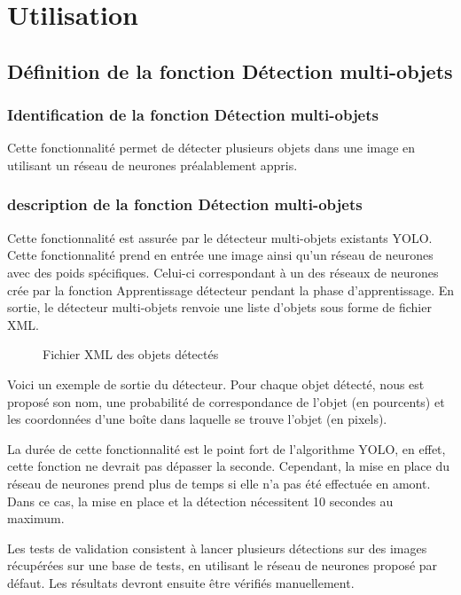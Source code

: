 \documentclass[debug,nodate,hideweeklyreports]{polytech/polytech}
\begin{document}
\section{Utilisation}

\subsection{Définition de la fonction Détection multi-objets}

\subsubsection{Identification de la fonction Détection multi-objets}

Cette fonctionnalité permet de détecter plusieurs objets dans une image en utilisant un réseau de neurones préalablement appris.

\subsubsection{description de la fonction Détection multi-objets}

Cette fonctionnalité est assurée par le détecteur multi-objets existants YOLO.
Cette fonctionnalité prend en entrée une image ainsi qu’un réseau de neurones avec des poids spécifiques. Celui-ci correspondant à un des réseaux de neurones crée par la fonction Apprentissage détecteur pendant la phase d’apprentissage.
En sortie, le détecteur multi-objets renvoie une liste d’objets sous forme de fichier XML.

\begin{figure}
  \caption{Fichier XML des objets détectés}
  \label{fig:objsxml}
\end{figure}

Voici un exemple de sortie du détecteur. Pour chaque objet détecté, nous est proposé son nom, une probabilité de correspondance de l’objet (en pourcents) et les coordonnées d’une boîte dans laquelle se trouve l’objet (en pixels). 

La durée de cette fonctionnalité est le point fort de l'algorithme YOLO, en effet, cette fonction ne devrait pas dépasser la seconde. Cependant, la mise en place du réseau de neurones prend plus de temps si elle n'a pas été effectuée en amont. Dans ce cas, la mise en place et la détection nécessitent 10 secondes au maximum.

Les tests de validation consistent à lancer plusieurs détections sur des images récupérées sur une base de tests, en utilisant le réseau de neurones proposé par défaut. Les résultats devront ensuite être vérifiés manuellement.
\end{document}

